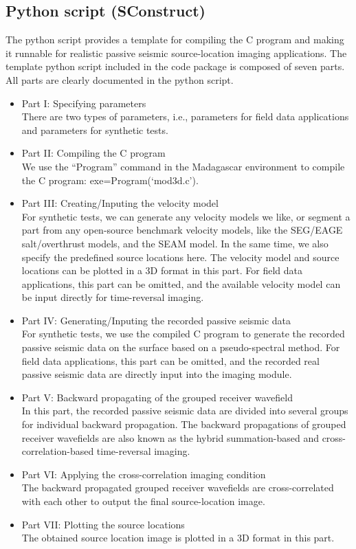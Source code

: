 \subsection{Python script (SConstruct)}
The python script provides a template for compiling the C program and making it runnable for realistic passive seismic source-location imaging applications. The template python script included in the code package is composed of seven parts. All parts are clearly documented in the python script.
\begin{itemize}
\item Part I: 	Specifying parameters\\
There are two types of parameters, i.e., parameters for field data applications and parameters for synthetic tests. 
\item Part II: 	Compiling the C program\\
We use the ``Program'' command in the Madagascar environment to compile the C program: exe=Program(`mod3d.c').
\item Part III: Creating/Inputing the velocity model\\
For synthetic tests, we can generate any velocity models we like, or segment a part from any open-source benchmark velocity models, like the SEG/EAGE salt/overthrust models, and the SEAM model. In the same time, we also specify the predefined source locations here. The velocity model and source locations can be plotted in a 3D format in this part. For field data applications, this part can be omitted, and the available velocity model can be input directly for time-reversal imaging. 
\item Part IV: 	Generating/Inputing the recorded passive seismic data \\
For synthetic tests, we use the compiled C program to generate the recorded passive seismic data on the surface based on a pseudo-spectral method. For field data applications, this part can be omitted, and the recorded real passive seismic data are directly input into the imaging module. 
\item Part V: 	Backward propagating of the grouped receiver wavefield \\
In this part, the recorded passive seismic data are divided into several groups for individual backward propagation. The backward propagations of grouped receiver wavefields are also known as the hybrid summation-based and cross-correlation-based time-reversal imaging. 
\item Part VI: 	Applying the cross-correlation imaging condition\\
The backward propagated grouped receiver wavefields are cross-correlated with each other to output the final source-location image.
\item Part VII: Plotting the source locations\\
The obtained source location image is plotted in a 3D format in this part.
\end{itemize}

